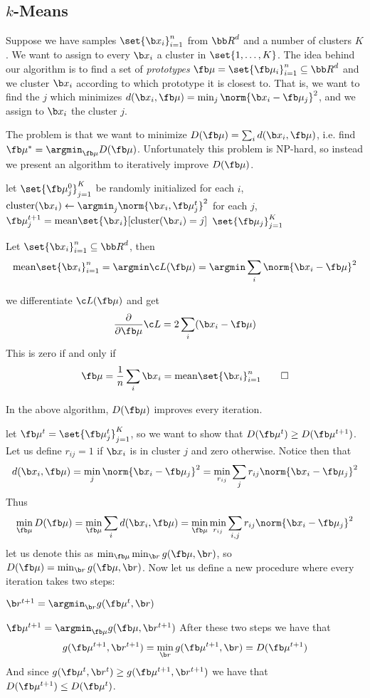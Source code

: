 \subsection{$k$-Means}

Suppose we have samples $\set{\b x_i}_{i=1}^n$ from ${\bb R}^d$ and a number of clusters $K$.
We want to assign to every $\b x_i$ a cluster in $\set{1,\dots,K}$.
The idea behind our algorithm is to find a set of {\it prototypes} $\fb\mu=\set{\fb\mu_i}_{i=1}^n\subseteq{\bb R}^d$ and we cluster $\b x_i$ according to which prototype it is closest to.
That is, we want to find the $j$ which minimizes $d(\b x_i,\fb\mu)=\min_j\norm{\b x_i-\fb\mu_j}^2$, and we assign to $\b x_i$ the cluster $j$.

The problem is that we want to minimize $D(\fb\mu)=\sum_id(\b x_i,\fb\mu)$, i.e. find $\fb\mu^*=\argmin_{\fb\mu}D(\fb\mu)$.
Unfortunately this problem is NP-hard, so instead we present an algorithm to iteratively improve $D(\fb\mu)$.

\algorithm
{}
    \State let $\set{\fb\mu_j^0}_{j=1}^K$ be randomly initialized
        \State for each $i$, ${\rm cluster}(\b x_i)\gets\argmin_j\norm{\b x_i,\fb\mu_j^t}^2$
        \State for each $j$, $\fb\mu_j^{t+1}={\rm mean}\set{\b x_i}[{\rm cluster}(\b x_i)=j]$
    \EndFor
    \State\Return $\set{\fb\mu_j}_{j=1}^K$
\EndFunc
\ealgorithm

\blemm

    Let $\set{\b x_i}_{i=1}^n\subseteq{\bb R}^d$, then
    $$ {\rm mean}\set{\b x_i}_{i=1}^n = \argmin\c L(\fb\mu) = \argmin\sum_i\norm{\b x_i-\fb\mu}^2 $$

\elemm

\Proof we differentiate $\c L(\fb\mu)$ and get
$$ \frac\partial{\partial\fb\mu}\c L = 2\sum_i(\b x_i-\fb\mu) $$
This is zero if and only if
$$ \fb\mu = \frac1n\sum_i\b x_i = {\rm mean}\set{\b x_i}_{i=1}^n \qed $$

\bprop

    In the above algorithm, $D(\fb\mu)$ improves every iteration.

\eprop

\Proof let $\fb\mu^t=\set{\fb\mu_j^t}_{j=1}^K$, so we want to show that $D(\fb\mu^t)\geq D(\fb\mu^{t+1})$.
Let us define $r_{ij}=1$ if $\b x_i$ is in cluster $j$ and zero otherwise.
Notice then that
$$ d(\b x_i,\fb\mu) = \min_j\norm{\b x_i-\fb\mu_j}^2 = \min_{r_{ij}}\sum_jr_{ij}\norm{\b x_i-\fb\mu_j}^2 $$
Thus
$$ \min_{\fb\mu}D(\fb\mu) = \min_{\fb\mu}\sum_id(\b x_i,\fb\mu) = \min_{\fb\mu}\min_{r_{ij}}\sum_{i,j}r_{ij}\norm{\b x_i-\fb\mu_j}^2 $$
let us denote this as $\min_{\fb\mu}\min_{\b r}g(\fb\mu,\b r)$, so $D(\fb\mu)=\min_{\b r}g(\fb\mu,\b r)$.
Now let us define a new procedure where every iteration takes two steps:
\benum
    \item $\b r^{t+1}=\argmin_{\b r}g(\fb\mu^t,\b r)$
    \item $\fb\mu^{t+1}=\argmin_{\fb\mu}g(\fb\mu,\b r^{t+1})$
\eenum
After these two steps we have that
$$ g(\fb\mu^{t+1},\b r^{t+1}) = \min_{\b r}g(\fb\mu^{t+1},\b r) = D(\fb\mu^{t+1}) $$
And since $g(\fb\mu^t,\b r^t)\geq g(\fb\mu^{t+1},\b r^{t+1})$ we have that $D(\fb\mu^{t+1})\leq D(\fb\mu^t)$.

